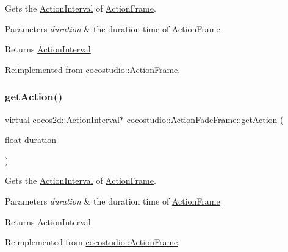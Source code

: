 Gets the \hyperlink{classActionInterval}{Action\+Interval} of \hyperlink{classcocostudio_1_1ActionFrame}{Action\+Frame}.


\begin{DoxyParams}{Parameters}
{\em duration} & the duration time of \hyperlink{classcocostudio_1_1ActionFrame}{Action\+Frame}\\
\hline
\end{DoxyParams}
\begin{DoxyReturn}{Returns}
\hyperlink{classActionInterval}{Action\+Interval} 
\end{DoxyReturn}


Reimplemented from \hyperlink{classcocostudio_1_1ActionFrame_a375216a44f6643d5e771299b1236dc51}{cocostudio\+::\+Action\+Frame}.

\mbox{\label{classcocostudio_1_1ActionFadeFrame_a8c4fd77023be47a8879597c06b89e2a1}} 
\subsubsection{\texorpdfstring{get\+Action()}{getAction()}\hspace{0.1cm}{\footnotesize\ttfamily [2/2]}}
{\footnotesize\ttfamily virtual cocos2d\+::\+Action\+Interval$\ast$ cocostudio\+::\+Action\+Fade\+Frame\+::get\+Action (\begin{DoxyParamCaption}\item[{float}]{duration }\end{DoxyParamCaption})\hspace{0.3cm}{\ttfamily [virtual]}}

Gets the \hyperlink{classActionInterval}{Action\+Interval} of \hyperlink{classcocostudio_1_1ActionFrame}{Action\+Frame}.


\begin{DoxyParams}{Parameters}
{\em duration} & the duration time of \hyperlink{classcocostudio_1_1ActionFrame}{Action\+Frame}\\
\hline
\end{DoxyParams}
\begin{DoxyReturn}{Returns}
\hyperlink{classActionInterval}{Action\+Interval} 
\end{DoxyReturn}


Reimplemented from \hyperlink{classcocostudio_1_1ActionFrame_a375216a44f6643d5e771299b1236dc51}{cocostudio\+::\+Action\+Frame}.

